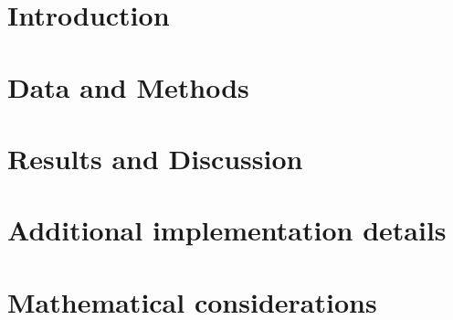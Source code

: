 \documentclass[a4paper,11pt,twoside,openany,british]{book}
\begin{document}
\frontmatter

\tableofcontents

\mainmatter
\chapter{Introduction}
\label{sec:Introduction}

\chapter{Data and Methods}
\label{sec:Methods}


\chapter{Results and Discussion}
\label{sec:Results and Discussion}


\appendix
\chapter{Additional implementation details}

\chapter{Mathematical considerations}


\backmatter
\printbibliography[heading=bibintoc]
\printnoidxglossary[type=definitions]
\printnoidxglossary[type=\acronymtype,nonumberlist]
\printnoidxglossary[type=symbols,nonumberlist]
\glsaddallunused[symbols]
\end{document}
